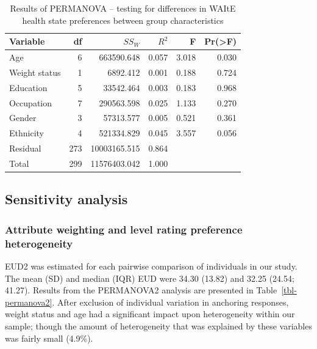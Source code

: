 \documentclass[
  number,
  preprint]{elsarticle}
\begin{document}
\begin{longtable}[]{@{}lrrrrr@{}}

\caption{\label{tbl-permanova}Results of PERMANOVA -- testing for
differences in WAItE health state preferences between group
characteristics}

\tabularnewline

\toprule\noalign{}
Variable & df & \(SS_W\) & \(R^2\) & F & Pr(\textgreater F) \\
\midrule\noalign{}
\endhead
\bottomrule\noalign{}
\endlastfoot
Age & 6 & 663590.648 & 0.057 & 3.018 & 0.030 \\
Weight status & 1 & 6892.412 & 0.001 & 0.188 & 0.724 \\
Education & 5 & 33542.464 & 0.003 & 0.183 & 0.968 \\
Occupation & 7 & 290563.598 & 0.025 & 1.133 & 0.270 \\
Gender & 3 & 57313.577 & 0.005 & 0.521 & 0.361 \\
Ethnicity & 4 & 521334.829 & 0.045 & 3.557 & 0.056 \\
Residual & 273 & 10003165.515 & 0.864 & & \\
Total & 299 & 11576403.042 & 1.000 & & \\

\end{longtable}

\subsection{Sensitivity analysis}\label{sensitivity-analysis-1}

\subsubsection{Attribute weighting and level rating preference
heterogeneity}\label{attribute-weighting-and-level-rating-preference-heterogeneity}

EUD2 was estimated for each pairwise comparison of individuals in our
study. The mean (SD) and median (IQR) EUD were 34.30 (13.82) and 32.25
(24.54; 41.27). Results from the PERMANOVA2 analysis are presented in
Table~\ref{tbl-permanova2}. After exclusion of individual variation in
anchoring responses, weight status and age had a significant impact upon
heterogeneity within our sample; though the amount of heterogeneity that
was explained by these variables was fairly small (4.9\%).
\end{document}

